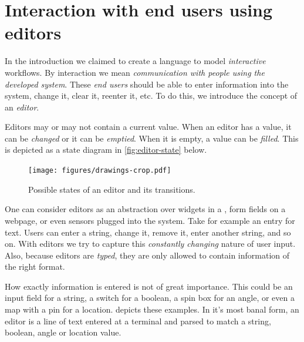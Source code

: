 
\section{Interaction with end users using editors}

In the introduction we claimed to create a language to model \emph{interactive} workflows.
By interaction we mean \emph{communication with people using the developed system}.
These \emph{end users} should be able to enter information into the system,
change it, clear it, reenter it, etc.
To do this, we introduce the concept of an \emph{editor}.

Editors may or may not contain a current value.
When an editor has a value, it can be \emph{changed} or it can be \emph{emptied}.
When it is empty, a value can be \emph{filled}.
This is depicted as a state diagram in \autoref{fig:editor-state} below.

\begin{figure}
  \centering
  \texttt{[image: figures/drawings-crop.pdf]}
  \caption{Possible states of an editor and its transitions.}
  \label{fig:editor-state}
\end{figure}

One can consider editors as an abstraction over widgets in a \GUI,
form fields on a webpage,
or even sensors plugged into the system.
Take for example an entry for text.
Users can enter a string, change it, remove it, enter another string, and so on.
With editors we try to capture this \emph{constantly changing} nature of user input.
Also, because editors are \emph{typed},
they are only allowed to contain information of the right format.

How exactly information is entered is not of great importance.
This could be an input field for a string,
a switch for a boolean,
a spin box for an angle,
or even a map with a pin for a location.
 depicts these examples.
In it's most banal form,
an editor is a line of text entered at a terminal and parsed to match a string, boolean, angle or location value.

